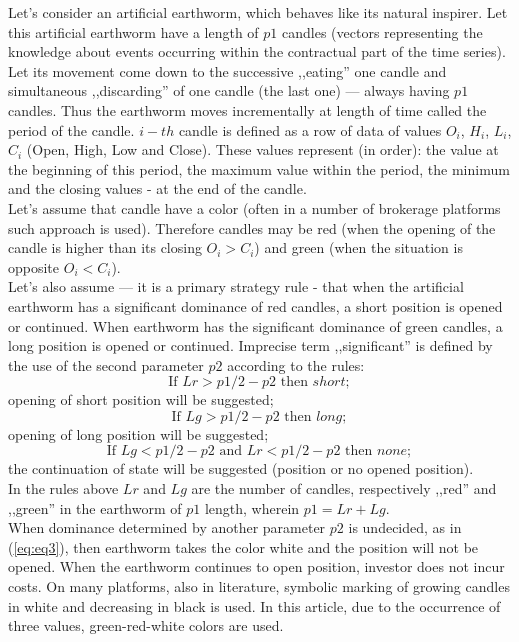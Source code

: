 \documentclass[runningheads,a4paper]{llncs}
\begin{document}
Let's consider an artificial earthworm, which behaves like its natural inspirer. Let this artificial earthworm have a length of $p1$ candles (vectors representing the knowledge about events occurring within the contractual part of the time series). Let its movement come down to the successive ,,eating'' one candle and simultaneous ,,discarding'' of one candle (the last one) --- always having $p1$ candles. Thus the earthworm moves incrementally at length of time called the period of the candle. $i-th$ candle is  defined as a row of data of values  $O_i$, $H_i$, $L_i$, $C_i$ (Open, High, Low and Close). These values represent (in order): the value at the beginning of this period, the maximum value within the period, the minimum and the closing values - at the end of the candle.\\
Let's assume that candle have a color (often in a number of brokerage platforms such approach is used). Therefore candles may be red (when the opening of the candle is higher than its closing $O_i>C_i$) and green (when the situation is opposite $O_i<C_i$).\\
Let's also assume --- it is a primary strategy rule - that when the artificial earthworm has a significant dominance of red candles, a short position is opened or continued. When earthworm has the significant dominance of green candles, a long position is opened or continued. Imprecise term ,,significant'' is defined by the use of the second parameter $p2$ according to the rules:
\begin{equation}
\text{If }  Lr > p1/2 -p2 \text{ then } short;
\end{equation}
opening of short position will be suggested;
\begin{equation}
\text{If }  Lg > p1/2 -p2 \text{ then } long;
\end{equation}
opening of long position will be suggested;
\begin{equation}
\text{If }  Lg < p1/2 -p2 \text{ and } Lr< p1/2-p2 \text{ then } none;
\label{eq:eq3}
\end{equation}
the continuation of state will be suggested (position or no opened position).\\

In the rules above $Lr$ and $Lg$ are the number of candles, respectively ,,red'' and ,,green'' in the earthworm of $p1$ length, wherein $p1 = Lr + Lg$.\\
When dominance determined by another parameter $p2$ is undecided, as in (\ref{eq:eq3}), then earthworm takes the color white and the position will not be opened. When the earthworm continues to open position, investor does not incur costs. On many platforms, also in literature, symbolic marking of growing candles in white and decreasing in black is used. In this article, due to the occurrence of three values, green-red-white colors are used.\\
\end{document}
